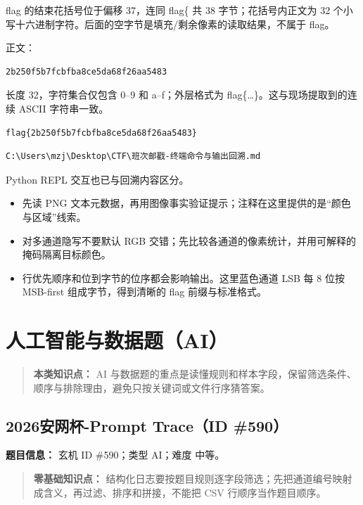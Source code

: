flag 的结束花括号位于偏移 37，连同 flag\{ 共 38 字节；花括号内正文为 32 个小写十六进制字符。后面的空字节是填充/剩余像素的读取结果，不属于 flag。

正文：

\begin{verbatim}
2b250f5b7fcbfba8ce5da68f26aa5483
\end{verbatim}

长度 32，字符集合仅包含 0--9 和 a--f；外层格式为 flag\{\ldots\}。这与现场提取到的连续 ASCII 字符串一致。

\begin{verbatim}
flag{2b250f5b7fcbfba8ce5da68f26aa5483}
\end{verbatim}

\begin{verbatim}
C:\Users\mzj\Desktop\CTF\班次邮戳-终端命令与输出回溯.md
\end{verbatim}

Python REPL 交互也已与回溯内容区分。

\begin{itemize}
\tightlist
\item
  先读 PNG 文本元数据，再用图像事实验证提示；注释在这里提供的是``颜色与区域''线索。
\item
  对多通道隐写不要默认 RGB 交错；先比较各通道的像素统计，并用可解释的掩码隔离目标颜色。
\item
  行优先顺序和位到字节的位序都会影响输出。这里蓝色通道 LSB 每 8 位按 MSB-first 组成字节，得到清晰的 flag 前缀与标准格式。
\end{itemize}

\chapter{人工智能与数据题（AI）}\label{ux4ebaux5de5ux667aux80fdux4e0eux6570ux636eux9898ai}

\begin{quote}
\textbf{本类知识点：} AI 与数据题的重点是读懂规则和样本字段，保留筛选条件、顺序与排除理由，避免只按关键词或文件行序猜答案。
\end{quote}

\section{2026安网杯-Prompt Trace（ID \#590）}\label{ux5b89ux7f51ux676f-prompt-traceid-590}

\textbf{题目信息：} 玄机 ID \#590；类型 AI；难度 中等。

\begin{quote}
\textbf{零基础知识点：} 结构化日志要按题目规则逐字段筛选；先把通道编号映射成含义，再过滤、排序和拼接，不能把 CSV 行顺序当作题目顺序。
\end{quote}

